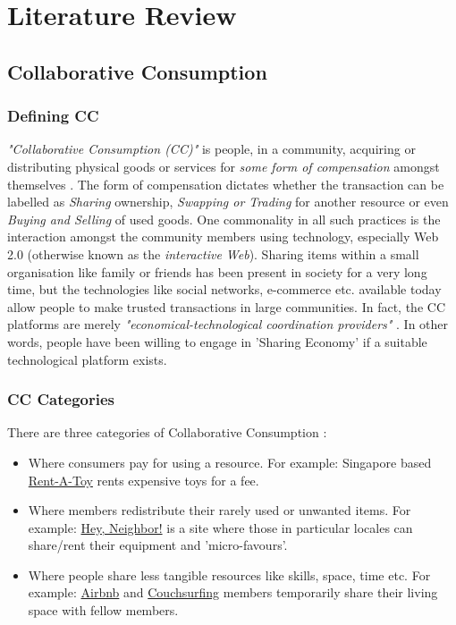 \chapter{Literature Review}
\label{chap:lit}

\section{Collaborative Consumption}

\subsection{Defining CC}
\textit{"Collaborative Consumption (CC)"} is people, in a community, acquiring or distributing physical goods or services for \textit{some form of compensation} amongst themselves \cite{Belk:2014}. The form of compensation dictates whether the transaction can be labelled as \textit{Sharing} ownership, \textit{Swapping or Trading} for another resource or even \textit{Buying and Selling} of used goods. One commonality in all such practices is the interaction amongst the community members using technology, especially Web 2.0 (otherwise known as the \textit{interactive Web}). Sharing items within a small organisation like family or friends has been present in society for a very long time, but the technologies like social networks, e-commerce etc. available today allow people to make trusted transactions in large communities. In fact, the CC platforms are merely \textit{"economical-technological coordination providers"} \cite{Hamari:2015}. In other words, people have been willing to engage in 'Sharing Economy' if a suitable technological platform exists.\\

\subsection{CC Categories}
There are three categories of Collaborative Consumption \cite{Albinsson:2012} :

\begin{itemize}

	\item Where consumers pay for using a resource. For example: Singapore based \href{http://www.rent-that-toy.com}{Rent-A-Toy} rents expensive toys for a fee.
	
	\item Where members redistribute their rarely used or unwanted items. For example: \href{http://www.heyneighborapp.com}{Hey, Neighbor!} is a site where those in particular locales can share/rent their equipment and 'micro-favours'.
	
	\item Where people share less tangible resources like skills, space, time etc. For example: \href{https://www.airbnb.co.uk}{Airbnb} and \href{https://www.couchsurfing.com}{Couchsurfing} members temporarily share their living space with fellow members.

\end{itemize}

